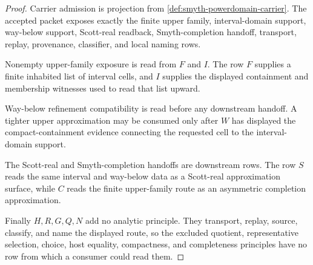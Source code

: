 \begin{proof}
Carrier admission is projection from \autoref{def:smyth-powerdomain-carrier}. The accepted packet exposes exactly the finite upper family, interval-domain support, way-below support, Scott-real readback, Smyth-completion handoff, transport, replay, provenance, classifier, and local naming rows.

Nonempty upper-family exposure is read from $F$ and $I$. The row $F$ supplies a finite inhabited list of interval cells, and $I$ supplies the displayed containment and membership witnesses used to read that list upward.

Way-below refinement compatibility is read before any downstream handoff. A tighter upper approximation may be consumed only after $W$ has displayed the compact-containment evidence connecting the requested cell to the interval-domain support.

The Scott-real and Smyth-completion handoffs are downstream rows. The row $S$ reads the same interval and way-below data as a Scott-real approximation surface, while $C$ reads the finite upper-family route as an asymmetric completion approximation.

Finally $H,R,G,Q,N$ add no analytic principle. They transport, replay, source, classify, and name the displayed route, so the excluded quotient, representative selection, choice, host equality, compactness, and completeness principles have no row from which a consumer could read them.
\end{proof}

